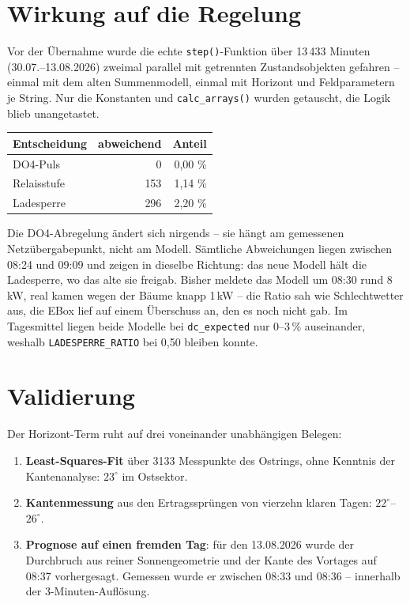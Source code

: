 \documentclass[11pt, a4paper]{article}
\begin{document}
\section{Wirkung auf die Regelung}

Vor der Übernahme wurde die echte \texttt{step()}-Funktion über 13\,433 Minuten
(30.07.--13.08.2026) zweimal parallel mit getrennten Zustandsobjekten gefahren --
einmal mit dem alten Summenmodell, einmal mit Horizont und Feldparametern je
String. Nur die Konstanten und \texttt{calc\_arrays()} wurden getauscht, die
Logik blieb unangetastet.

\begin{center}
\begin{tabular}{lrr}
\toprule
Entscheidung & abweichend & Anteil\\
\midrule
DO4-Puls     &   0 & 0{,}00 \%\\
Relaisstufe  & 153 & 1{,}14 \%\\
Ladesperre   & 296 & 2{,}20 \%\\
\bottomrule
\end{tabular}
\end{center}

Die DO4-Abregelung ändert sich nirgends -- sie hängt am gemessenen
Netzübergabepunkt, nicht am Modell. Sämtliche Abweichungen liegen zwischen 08:24
und 09:09 und zeigen in dieselbe Richtung: das neue Modell hält die Ladesperre,
wo das alte sie freigab. Bisher meldete das Modell um 08:30 rund 8\,kW, real
kamen wegen der Bäume knapp 1\,kW -- die Ratio sah wie Schlechtwetter aus, die
EBox lief auf einem Überschuss an, den es noch nicht gab. Im Tagesmittel liegen
beide Modelle bei \texttt{dc\_expected} nur 0--3\,\% auseinander, weshalb
\texttt{LADESPERRE\_RATIO} bei 0{,}50 bleiben konnte.

\section{Validierung}

Der Horizont-Term ruht auf drei voneinander unabhängigen Belegen:

\begin{enumerate}
\item \textbf{Least-Squares-Fit} über 3133 Messpunkte des Ostrings, ohne Kenntnis
  der Kantenanalyse: $23^\circ$ im Ostsektor.
\item \textbf{Kantenmessung} aus den Ertragssprüngen von vierzehn klaren Tagen:
  $22^\circ$--$26^\circ$.
\item \textbf{Prognose auf einen fremden Tag}: für den 13.08.2026 wurde der
  Durchbruch aus reiner Sonnengeometrie und der Kante des Vortages auf 08:37
  vorhergesagt. Gemessen wurde er zwischen 08:33 und 08:36 -- innerhalb der
  3-Minuten-Auflösung.
\end{enumerate}
\end{document}
